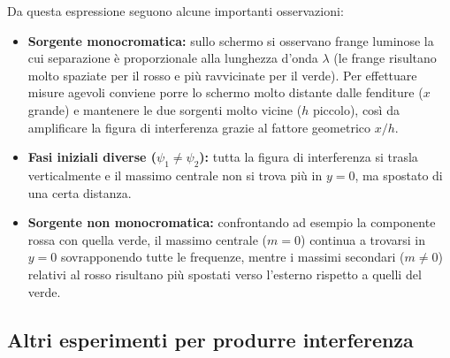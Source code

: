 \documentclass[openany,a4paper,12pt]{book}
\begin{document}
Da questa espressione seguono alcune importanti osservazioni:
\begin{itemize}
    \item \textbf{Sorgente monocromatica:} sullo schermo si osservano frange luminose la cui separazione è proporzionale alla lunghezza d'onda $\lambda$ (le frange risultano molto spaziate per il rosso e più ravvicinate per il verde). Per effettuare misure agevoli conviene porre lo schermo molto distante dalle fenditure ($x$ grande) e mantenere le due sorgenti molto vicine ($h$ piccolo), così da amplificare la figura di interferenza grazie al fattore geometrico $x/h$.
    \item \textbf{Fasi iniziali diverse ($\psi_1 \neq \psi_2$):} tutta la figura di interferenza si trasla verticalmente e il massimo centrale non si trova più in $y = 0$, ma spostato di una certa distanza.
    \item \textbf{Sorgente non monocromatica:} confrontando ad esempio la componente rossa con quella verde, il massimo centrale ($m=0$) continua a trovarsi in $y=0$ sovrapponendo tutte le frequenze, mentre i massimi secondari ($m \neq 0$) relativi al rosso risultano più spostati verso l'esterno rispetto a quelli del verde.
\end{itemize}

\subsection*{Altri esperimenti per produrre interferenza}
\end{document}
